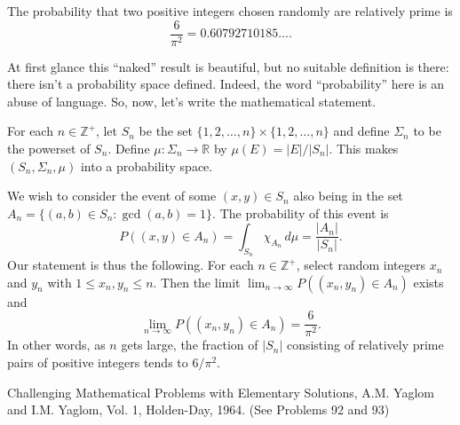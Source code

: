 \documentclass[12pt]{article}
\begin{document}
The probability that two positive integers chosen randomly are 
relatively prime is 
\[
\frac{6}{\pi^{2}} = 0.60792710185\dots.
\]

At first glance this ``naked'' result is beautiful, but no 
suitable definition is there: there isn't a probability space 
defined. Indeed, the word ``probability'' here is an abuse of
language.
So, now, let's write the mathematical statement.

For each $n\in\mathbb{Z}^+$, let $S_n$ be the set $\{1,2,\dots,n\}\times\{1,2,\dots,n\}$ and define
$\Sigma_n$ to be the powerset of $S_n$.  Define 
$\mu\colon\Sigma_n\to\mathbb{R}$ by $\mu(E)=|E|/|S_n|$.  This makes
$(S_n,\Sigma_n,\mu)$ into a probability space.

We wish to consider the event of some $(x,y)\in S_n$ also being 
in the set
$A_n=\{(a,b)\in S_n\colon\gcd(a,b)=1\}$.
The probability of this event is 
\[
P((x,y)\in A_n)=\int_{S_n} \chi_{A_n} \,d\mu=\frac{|A_n|}{|S_n|}.
\]
Our statement is thus the following.  For each $n\in\mathbb{Z}^+$,
select random integers $x_n$ and $y_n$ with $1\le x_n, y_n\le n$.
Then the limit $\lim_{n\to\infty}P((x_n,y_n)\in A_n)$ exists and
\[
\lim_{n\to\infty}P((x_n,y_n)\in A_n)=\frac{6}{\pi^2}.
\]
In other words, as $n$ gets large, the fraction of $|S_n|$ consisting of relatively prime pairs of positive integers tends to $6/\pi^2$.

\begin{thebibliography}{9}
 Challenging Mathematical Problems with Elementary Solutions, A.M. Yaglom and I.M. Yaglom, Vol. 1, Holden-Day, 1964. (See Problems 92 and 93)
\end{thebibliography}
\end{document}
